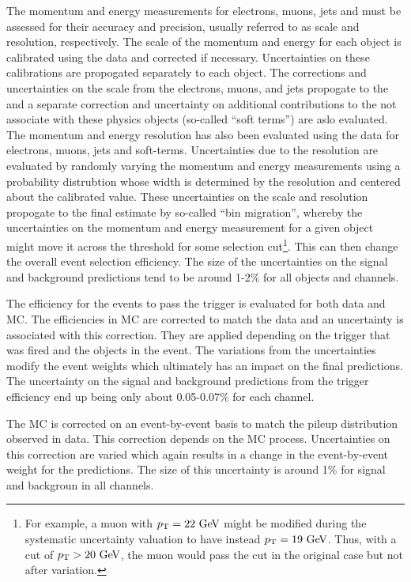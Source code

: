 The momentum and energy measurements for electrons, muons, jets and \MET
must be assessed for their accuracy and precision, usually referred to
as scale and resolution, respectively. The scale of the momentum and energy 
for each object is calibrated using the data and corrected if necessary.
Uncertainties on these calibrations are propogated separately to each object.
The corrections and uncertainties on the scale
from the electrons, muons, and jets propogate to the \MET and a separate
correction and uncertainty on additional contributions to the \MET
not associate with these physics objects (so-called ``soft terms'')
are aslo evaluated. 
The momentum and energy resolution has also been evaluated using the data
for electrons, muons, jets and \MET soft-terms.  Uncertainties due to the
resolution are evaluated by randomly varying the momentum and energy measurements
using a probability distrubtion whose width is determined by the resolution
and centered about the calibrated value. These uncertainties on the scale
and resolution propogate to the final estimate by so-called ``bin migration'',
whereby the uncertainties on the momentum and energy measurement 
for a given object might move it across the threshold for some 
selection cut\footnote{For example, a muon with $\pt = 22 \GeV$ might
be modified during the systematic uncertainty valuation to have instead
$\pt = 19 \GeV$. Thus, with a cut of $\pt > 20 \GeV$, the muon would pass the
cut in the original case but not after variation.}. This can 
then change the overall event selection efficiency. The size of the uncertainties
on the signal and background predictions tend to be around 1-2\% for
all objects and channels.


The efficiency for the events to pass the trigger is evaluated for both 
data and MC.  The efficiencies in MC are corrected to match the data
and an uncertainty is associated with this correction.  They are applied
depending on the trigger that was fired and the objects in the event.
The variations from the uncertainties
modify the event weights which ultimately has an impact on the final predictions.
The uncertainty on the signal and background predictions from the trigger
efficiency end up being only about 0.05-0.07\%  for each channel.

The MC is corrected on an event-by-event basis to match the 
pileup distribution observed in data. This correction depends on the 
MC process. Uncertainties on this correction are varied which again
results in a change in the event-by-event weight for the predictions. The
size of this uncertainty is around 1\% for signal and backgroun in all channels.


